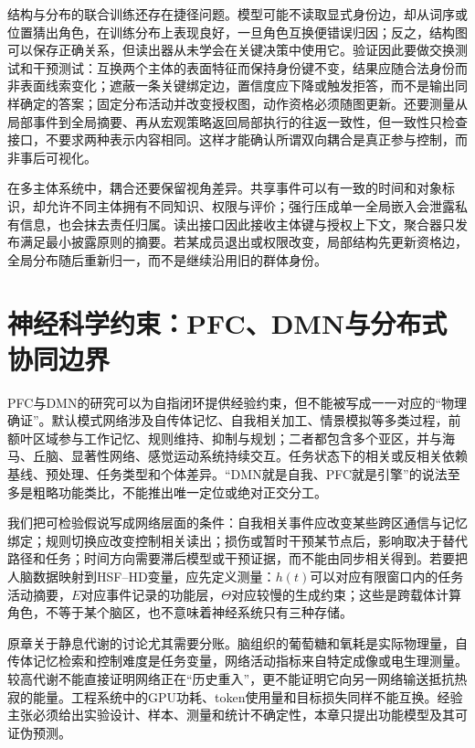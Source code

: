 结构与分布的联合训练还存在捷径问题。模型可能不读取显式身份边，却从词序或位置猜出角色，在训练分布上表现良好，一旦角色互换便错误归因；反之，结构图可以保存正确关系，但读出器从未学会在关键决策中使用它。验证因此要做交换测试和干预测试：互换两个主体的表面特征而保持身份键不变，结果应随合法身份而非表面线索变化；遮蔽一条关键绑定边，置信度应下降或触发拒答，而不是输出同样确定的答案；固定分布活动并改变授权图，动作资格必须随图更新。还要测量从局部事件到全局摘要、再从宏观策略返回局部执行的往返一致性，但一致性只检查接口，不要求两种表示内容相同。这样才能确认所谓双向耦合是真正参与控制，而非事后可视化。

在多主体系统中，耦合还要保留视角差异。共享事件可以有一致的时间和对象标识，却允许不同主体拥有不同知识、权限与评价；强行压成单一全局嵌入会泄露私有信息，也会抹去责任归属。读出接口因此接收主体键与授权上下文，聚合器只发布满足最小披露原则的摘要。若某成员退出或权限改变，局部结构先更新资格边，全局分布随后重新归一，而不是继续沿用旧的群体身份。

\section{神经科学约束：PFC、DMN与分布式协同边界}
\label{sec:biological_confirmation_pfc_dmn_symbiosis}

PFC与DMN的研究可以为自指闭环提供经验约束，但不能被写成一一对应的“物理确证”。默认模式网络涉及自传体记忆、自我相关加工、情景模拟等多类过程，前额叶区域参与工作记忆、规则维持、抑制与规划；二者都包含多个亚区，并与海马、丘脑、显著性网络、感觉运动系统持续交互。任务状态下的相关或反相关依赖基线、预处理、任务类型和个体差异。“DMN就是自我、PFC就是引擎”的说法至多是粗略功能类比，不能推出唯一定位或绝对正交分工。

我们把可检验假说写成网络层面的条件：自我相关事件应改变某些跨区通信与记忆绑定；规则切换应改变控制相关读出；损伤或暂时干预某节点后，影响取决于替代路径和任务；时间方向需要滞后模型或干预证据，而不能由同步相关得到。若要把人脑数据映射到HSF--HD变量，应先定义测量：$h(t)$可以对应有限窗口内的任务活动摘要，$E$对应事件记录的功能层，$\Theta$对应较慢的生成约束；这些是跨载体计算角色，不等于某个脑区，也不意味着神经系统只有三种存储。

原章关于静息代谢的讨论尤其需要分账。脑组织的葡萄糖和氧耗是实际物理量，自传体记忆检索和控制难度是任务变量，网络活动指标来自特定成像或电生理测量。较高代谢不能直接证明网络正在“历史重入”，更不能证明它向另一网络输送抵抗热寂的能量。工程系统中的GPU功耗、token使用量和目标损失同样不能互换。经验主张必须给出实验设计、样本、测量和统计不确定性，本章只提出功能模型及其可证伪预测。

